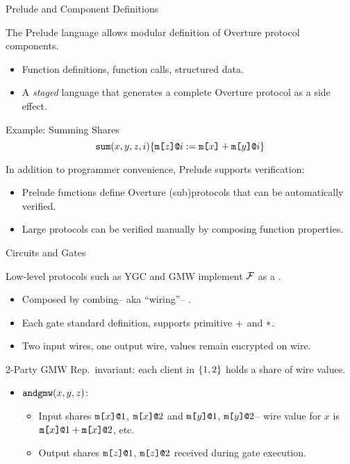 \documentclass{beamer}
\begin{document}
\begin{frame}{Prelude and Component Definitions}

  The Prelude language allows modular definition of Overture protocol components.
  \begin{itemize}
  \item Function definitions, function calls, structured data.
  \item A \emph{staged} language that generates a complete Overture protocol
    as a side effect.
  \end{itemize}
  
  \begin{exampleblock}{Example: Summing Shares}
    $$
    \texttt{sum}(x,y,z,i) \{ \texttt{m[}z\texttt{]}\texttt{@}i := \texttt{m[}x\texttt{]} + \texttt{m[}y\texttt{]}\texttt{@}i \} 
    $$
  \end{exampleblock}

  In addition to programmer convenience, Prelude supports verification:
  \begin{itemize}
  \item Prelude functions define Overture (sub)protocols that can be automatically verified.
  \item Large protocols can be verified manually by composing function properties. 
  \end{itemize}

\end{frame}

\begin{frame}{Circuits and Gates}

  Low-level protocols such as YGC and GMW implement $\mathcal{F}$ as a .
  \begin{itemize}
  \item Composed by combing-- aka ``wiring''-- .
  \item Each gate standard definition, supports primitive $+$ and $*$.
  \item Two input wires, one output wire, values remain encrypted on wire. 
  \end{itemize}

  \begin{exampleblock}{2-Party GMW}
    Rep.~invariant: each client in $\{ 1,2 \}$ holds a share of wire values.
    \begin{itemize}
    \item $\texttt{andgmw}(x,y,z)$:
      \begin{itemize}
      \item Input shares $\texttt{m[}x\texttt{]}\texttt{@}1$, $\texttt{m[}x\texttt{]}\texttt{@}2$ and $\texttt{m[}y\texttt{]}\texttt{@}1$, $\texttt{m[}y\texttt{]}\texttt{@}2$--
        wire value for $x$ is $\texttt{m[}x\texttt{]}\texttt{@}1 + \texttt{m[}x\texttt{]}\texttt{@}2$, etc.
      \item Output shares $\texttt{m[}z\texttt{]}\texttt{@}1$, $\texttt{m[}z\texttt{]}\texttt{@}2$ received during gate execution.
      \end{itemize}
    \end{itemize}    
  \end{exampleblock}

\end{frame}
\end{document}
